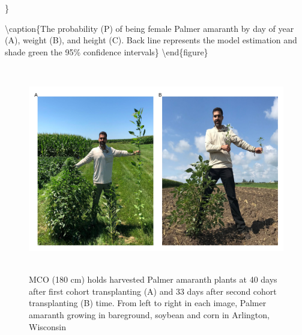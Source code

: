 \documentclass[utf8]{frontiersSCNS}
\begin{document}
\}

\textbackslash caption\{The probability (P) of being female Palmer
amaranth by day of year (A), weight (B), and height (C). Back line
represents the model estimation and shade green the 95\% confidence
intervals\}\label{fig:Figure-5} \textbackslash end\{figure\}

\begin{figure}

{\centering \includegraphics[width=150mm,height=90mm]{../data analysis/figures/Figure 6} 

}

\caption{MCO (180 cm) holds harvested Palmer amaranth plants at 40 days after first cohort transplanting (A) and 33 days after second cohort transplanting (B) time. From left to right in each image, Palmer amaranth growing in bareground, soybean and corn in Arlington, Wisconsin}\label{fig:Figure-6}
\end{figure}
\end{document}
